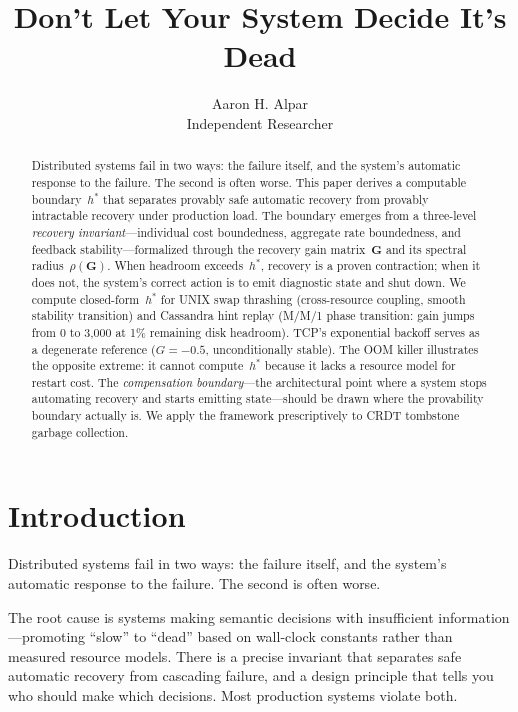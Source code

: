 \documentclass[11pt]{article}
\title{Don't Let Your System Decide It's Dead}
\author{Aaron H. Alpar\\Independent Researcher}
\date{}
\begin{document}
\doclicenseThis
\maketitle

\begin{abstract}
Distributed systems fail in two ways: the failure itself, and the system's
automatic response to the failure. The second is often worse. This paper derives
a computable boundary~$h^*$ that separates provably safe automatic recovery from
provably intractable recovery under production load. The boundary emerges from a
three-level \emph{recovery invariant}---individual cost boundedness, aggregate
rate boundedness, and feedback stability---formalized through the recovery gain
matrix~$\mathbf{G}$ and its spectral radius~$\rho(\mathbf{G})$. When headroom
exceeds~$h^*$, recovery is a proven contraction; when it does not, the system's
correct action is to emit diagnostic state and shut down. We compute
closed-form~$h^*$ for UNIX swap thrashing (cross-resource coupling, smooth
stability transition) and Cassandra hint replay (M/M/1 phase transition: gain
jumps from 0 to 3{,}000 at 1\% remaining disk headroom). TCP's exponential
backoff serves as a degenerate reference ($G = -0.5$, unconditionally stable).
The OOM killer illustrates the opposite extreme: it cannot compute~$h^*$ because
it lacks a resource model for restart cost. The \emph{compensation
boundary}---the architectural point where a system stops automating recovery and
starts emitting state---should be drawn where the provability boundary actually
is. We apply the framework prescriptively to CRDT tombstone garbage collection.
\end{abstract}

\section{Introduction}

Distributed systems fail in two ways: the failure itself, and the system's
automatic response to the failure. The second is often worse.

The root cause is systems making semantic decisions with insufficient
information---promoting ``slow'' to ``dead'' based on wall-clock constants
rather than measured resource models. There is a precise invariant that
separates safe automatic recovery from cascading failure, and a design principle
that tells you who should make which decisions. Most production systems violate
both.
\end{document}
